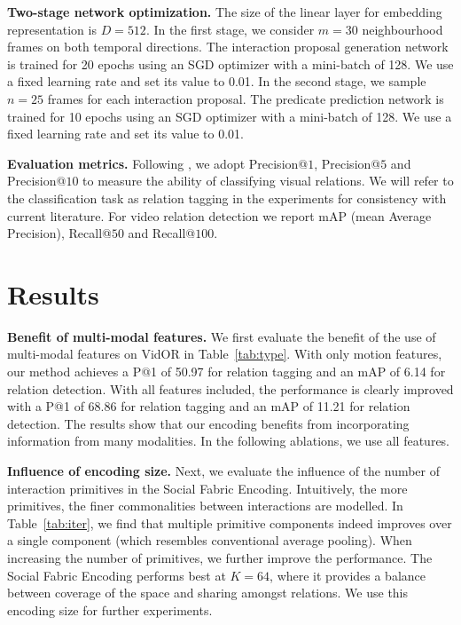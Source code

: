 \documentclass[10pt,twocolumn,letterpaper]{article}
\begin{document}
\textbf{Two-stage network optimization.} The size of the linear layer for embedding representation is $D{=}512$. In the first stage, we consider $m{=}30$ neighbourhood frames on both temporal directions.
The interaction proposal generation network is trained for 20 epochs using an SGD optimizer with a mini-batch of 128. We use a fixed learning rate and set its value to 0.01. 
In the second stage, we sample $n{=}25$ frames for each interaction proposal. The predicate prediction network is trained for 10 epochs using an SGD optimizer with a mini-batch of 128. We use a fixed learning rate and set its value to 0.01. 


\textbf{Evaluation metrics.} Following \cite{shang2017video},
we adopt Precision@$1$, Precision@$5$ and Precision@$10$ to measure the ability of classifying visual relations. We will refer to the classification task as relation tagging in the experiments for consistency with current literature. For video relation detection we report mAP (mean Average Precision), Recall@$50$ and Recall@$100$.


\section{Results}


\textbf{Benefit of multi-modal features.}
We first evaluate the benefit of the use of multi-modal features on VidOR in Table~\ref{tab:type}. With only motion features, our method achieves a P@1 of 50.97 for relation tagging and an mAP of 6.14 for relation detection. With all features included, the performance is clearly improved with a P@1 of 68.86 for relation tagging and an mAP of 11.21 for relation detection.
The results show that our encoding benefits from incorporating information from many modalities. In the following ablations, we use all features.

\textbf{Influence of encoding size.} 
Next, we evaluate the influence of the number of interaction primitives in the Social Fabric Encoding. Intuitively, the more primitives, the finer commonalities between interactions are modelled. In Table~\ref{tab:iter}, we find that multiple primitive components indeed improves over a single component (which resembles conventional average pooling).
When increasing the number of primitives, we further improve the performance. The Social Fabric Encoding performs best at $K{=}64$, where it provides a balance between coverage of the space and sharing amongst relations. We use this encoding size for further experiments.
\end{document}

